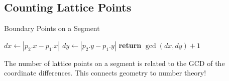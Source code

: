 
\subsection{Counting Lattice Points}

\begin{algorithm}[H]
\caption{Boundary Points on a Segment}
$dx \leftarrow |p_2.x - p_1.x|$\;
$dy \leftarrow |p_2.y - p_1.y|$\;
\textbf{return} $\gcd(dx, dy) + 1$\;
\end{algorithm}

\begin{insight}
The number of lattice points on a segment is related to the GCD of the coordinate differences. This connects geometry to number theory!
\end{insight} 